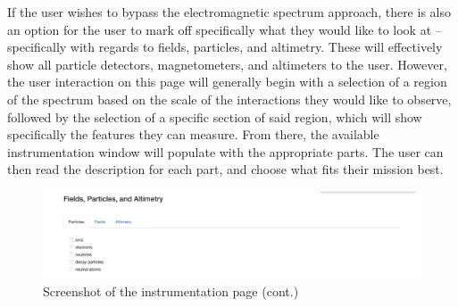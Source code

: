 \documentclass[a4, 12 pt]{article} %
\begin{document}
If the user wishes to bypass the electromagnetic spectrum approach, there is also an option for the user to mark off specifically what they would like to look at -- specifically with regards to fields, particles, and altimetry. These will effectively show all particle detectors, magnetometers, and altimeters to the user. However, the user interaction on this page will generally begin with a selection of a region of the spectrum based on the scale of the interactions they would like to observe, followed by the selection of a specific section of said region, which will show specifically the features they can measure. From there, the available instrumentation window will populate with the appropriate parts. The user can then read the description for each part, and choose what fits their mission best. 
\begin{figure}[H]
\begin{center}
\includegraphics[width=\linewidth]{2b}
\caption{Screenshot of the instrumentation page (cont.)}
\label{default}
\end{center}
\end{figure}
\end{document}
